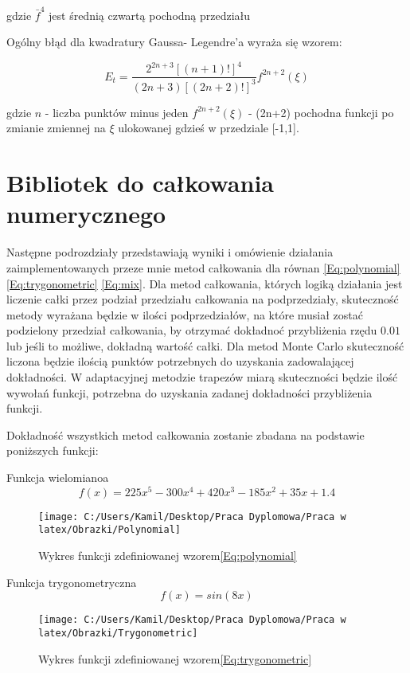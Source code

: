 \documentclass[12pt,twoside]{article}
\begin{document}
gdzie $\bar{f}^{4}$ jest średnią czwartą pochodną przedziału

Ogólny błąd dla kwadratury Gaussa- Legendre'a wyraża się wzorem:

\begin{equation}
E_t = \frac{2^{2n+3}[(n+1)!]^4}{(2n+3)[(2n+2)!]^3}f^{2n+2}(\xi)
\label{Eq:rownanie}
\end{equation}

gdzie $n$ - liczba punktów minus jeden
$f^{2n+2}(\xi)$ - (2n+2) pochodna funkcji po zmianie zmiennej na $\xi$ ulokowanej gdzieś w przedziale [-1,1]. 


\section{Bibliotek do całkowania numerycznego}
Następne podrozdziały przedstawiają wyniki i omówienie działania zaimplementowanych przeze mnie metod całkowania dla równan \eqref{Eq:polynomial} \eqref{Eq:trygonometric} \eqref{Eq:mix}. Dla metod całkowania, których logiką działania jest liczenie całki przez podział przedziału całkowania na podprzedziały, skuteczność metody wyrażana będzie w ilości podprzedziałów, na które musiał zostać podzielony przedział całkowania, by otrzymać dokładnoć przybliżenia rzędu $0.01$ lub jeśli to możliwe, dokładną wartość całki.
Dla metod Monte Carlo skuteczność liczona będzie ilością punktów potrzebnych do uzyskania zadowalającej dokładności.
W adaptacyjnej metodzie trapezów miarą skuteczności będzie ilość wywołań funkcji, potrzebna do uzyskania zadanej dokładności przybliżenia funkcji.


Dokładność wszystkich metod całkowania zostanie zbadana na podstawie poniższych funkcji:

Funkcja wielomianoa
\begin{equation}
f(x) = 225x^5 - 300x^4 + 420x^3-185x^2+35x + 1.4
\label{Eq:polynomial}
\end{equation}

\begin{figure}
\texttt{[image: C:/Users/Kamil/Desktop/Praca Dyplomowa/Praca w latex/Obrazki/Polynomial]}
\caption{Wykres funkcji zdefiniowanej wzorem\eqref{Eq:polynomial}}
\end{figure}

Funkcja trygonometryczna
\begin{equation}
f(x) = sin(8x)
\label{Eq:trygonometric}
\end{equation}

\begin{figure}
\texttt{[image: C:/Users/Kamil/Desktop/Praca Dyplomowa/Praca w latex/Obrazki/Trygonometric]}
\caption{Wykres funkcji zdefiniowanej wzorem\eqref{Eq:trygonometric}}
\end{figure}
\end{document}
